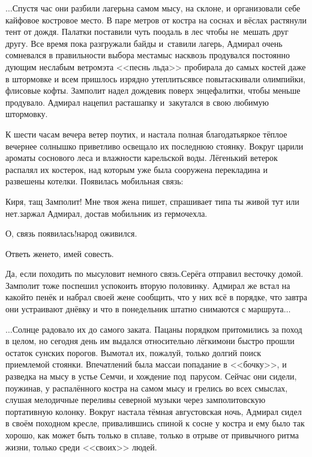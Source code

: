 \vspace{0.5cm}
$\ldots$Спустя час они разбили лагерь\mdash на самом мысу, на склоне, и организовали себе кайфовое костровое место. В паре метров от костра на соснах и вёслах растянули тент от дождя. Палатки поставили чуть поодаль в лес чтобы не~мешать друг другу. Все время пока разгружали байды и~ставили лагерь, Адмирал очень сомневался в правильности выбора места\mdash мыс насквозь продувался постоянно дующим неслабым ветром\mdash эта <<песнь льда>> пробирала до самых костей даже в штормовке и всем пришлось изрядно утеплиться\mdash все повытаскивали олимпийки, флисовые кофты. Замполит надел дождевик поверх энцефалитки, чтобы меньше продувало. Адмирал нацепил раста\sdash шапку и~закутался в свою любимую штормовку.

К шести часам вечера ветер поутих, и настала полная благодать\mdash яркое тёплое вечернее солнышко приветливо освещало их последнюю стоянку. Вокруг царили ароматы соснового леса и влажности карельской воды. Лёгенький ветерок распалял их костерок, над которым уже была сооружена перекладина и развешены котелки. Появилась мобильная связь:

\diagdash Киря, тащ Замполит! Мне твоя жена пишет, спрашивает типа ты живой тут или нет.\mdash заржал Адмирал, достав мобильник из гермочехла.

\diagdash О, связь появилась!\mdash народ оживился.

\diagdash Ответь жене\sdash то, имей совесть.

\diagdash Да, если походить по мысу\mdash ловит немного связь.\mdash Серёга отправил весточку домой. Замполит тоже поспешил успокоить вторую половинку. Адмирал же встал на какой\sdash то пенёк и набрал своей жене сообщить, что у них всё в порядке, что завтра они устраивают днёвку и что в понедельник штатно снимаются с маршрута$\ldots$

\vspace{0.5cm}
$\ldots$Солнце радовало их до самого заката. Пацаны порядком притомились за поход в целом, но сегодня день им выдался относительно лёгким\mdash они быстро прошли остаток сунских порогов. Вымотал их, пожалуй, только долгий поиск приемлемой стоянки. Впечатлений была масса\mdash и попадание в <<бочку>>, и разведка на мысу в устье Семчи, и хождение под~парусом. Сейчас они сидели, поужинав, у распалённого костра на самом мысу и грелись во всех смыслах, слушая мелодичные переливы северной музыки через замполитовскую портативную колонку. Вокруг настала тёмная августовская ночь, Адмирал сидел в своём походном кресле, привалившись спиной к сосне у костра и ему было так хорошо, как может быть только в сплаве, только в отрыве от привычного ритма жизни, только среди <<своих>> людей.








\begin{center}
\end{center}
